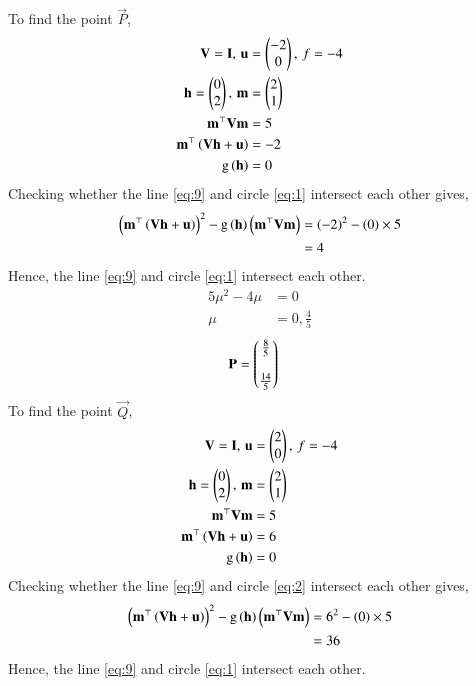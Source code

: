 \documentclass[journal,12pt,twocolumn]{IEEEtran}
\begin{document}
\begin{enumerate}
To find the point $\vec{P}$,
\begin{align}
\mathbf{V} = \mathbf{I}, \, \mathbf{u} &= \begin{pmatrix}-2\\0\end{pmatrix}, \, f = -4\\
\mathbf{h} = \begin{pmatrix}0\\2\end{pmatrix}, \, \mathbf{m} &= \begin{pmatrix}2\\1\end{pmatrix}\\
\mathbf{m}^{\top}\mathbf{V}\mathbf{m} &= 5\\
\mathbf{m}^{\top}\left(\mathbf{V}\mathbf{h}+\mathbf{u}\right) &= -2\\
\text{g}\left(\mathbf{h}\right) &= 0 
\end{align}
Checking whether the line \eqref{eq:9} and circle \eqref{eq:1} intersect each other gives,
\begin{align}
{\ensuremath{\left(\mathbf{m}^{\top}\left(\mathbf{V}\mathbf{h}+\mathbf{u}\right)\right)}}^2-\text{g}\left(\mathbf{h}\right)\left(\mathbf{m}^{\top}\mathbf{V}\mathbf{m}\right) &= \left(-2\right)^2 - \left(0\right)\times5\\
&= 4
\end{align}
Hence, the line \eqref{eq:9} and circle \eqref{eq:1} intersect each other.
\begin{align}
5\mu^2 - 4 \mu &=0\\
\mu &= 0, \frac{4}{5}
\end{align}
\begin{align}
\mathbf{P} &= \begin{pmatrix}\frac{8}{5}\\\\ \frac{14}{5}\end{pmatrix}
\end{align}
To find the point $\vec{Q}$,
\begin{align}
\mathbf{V} = \mathbf{I}, \, \mathbf{u} &= \begin{pmatrix}2\\0\end{pmatrix}, \, f = -4\\
\mathbf{h} = \begin{pmatrix}0\\2\end{pmatrix}, \, \mathbf{m} &= \begin{pmatrix}2\\1\end{pmatrix}\\
\mathbf{m}^{\top}\mathbf{V}\mathbf{m} &= 5\\
\mathbf{m}^{\top}\left(\mathbf{V}\mathbf{h}+\mathbf{u}\right) &= 6\\
\text{g}\left(\mathbf{h}\right) &= 0
\end{align}
Checking whether the line \eqref{eq:9} and circle \eqref{eq:2} intersect each other gives,
\begin{align}
{\ensuremath{\left(\mathbf{m}^{\top}\left(\mathbf{V}\mathbf{h}+\mathbf{u}\right)\right)}}^2-\text{g}\left(\mathbf{h}\right)\left(\mathbf{m}^{\top}\mathbf{V}\mathbf{m}\right) &= 6^2 - \left(0\right)\times5\\
&= 36
\end{align}
Hence, the line \eqref{eq:9} and circle \eqref{eq:1} intersect each other.

\end{enumerate}
\end{document}
